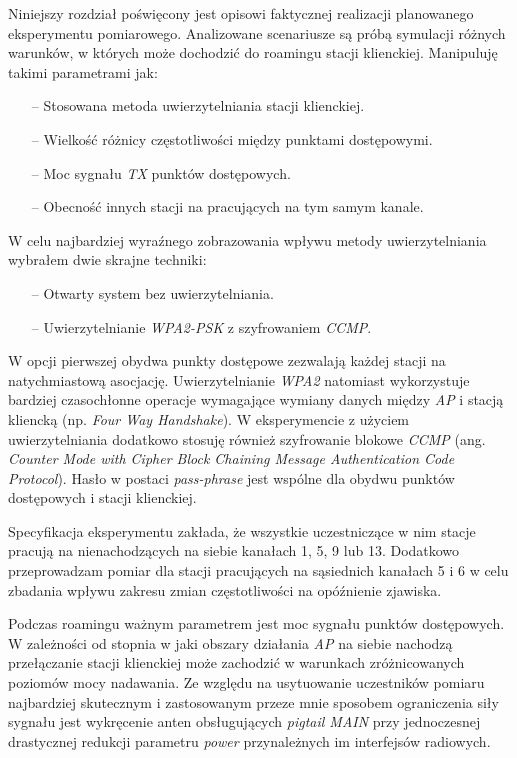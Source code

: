 %

Niniejszy rozdział poświęcony jest opisowi faktycznej realizacji planowanego eksperymentu pomiarowego. Analizowane scenariusze są próbą symulacji różnych warunków, w których może dochodzić do roamingu stacji klienckiej. Manipuluję takimi parametrami jak:
\begin{itemize}
\item[--] Stosowana metoda uwierzytelniania stacji klienckiej.
\item[--] Wielkość różnicy częstotliwości między punktami dostępowymi.
\item[--] Moc sygnału \emph{TX} punktów dostępowych. 
\item[--] Obecność innych stacji na pracujących na tym samym kanale.
\end{itemize}

W celu najbardziej wyraźnego zobrazowania wpływu metody uwierzytelniania wybrałem dwie skrajne techniki:
\begin{itemize}
\item[--] Otwarty system bez uwierzytelniania.
\item[--] Uwierzytelnianie \emph{WPA2-PSK} z szyfrowaniem \emph{CCMP}.
\end{itemize}

W opcji pierwszej obydwa punkty dostępowe zezwalają każdej stacji na natychmiastową asocjację. Uwierzytelnianie \emph{WPA2} natomiast wykorzystuje bardziej czasochłonne operacje wymagające wymiany danych między \emph{AP} i stacją kliencką (np. \emph{Four Way Handshake}). W eksperymencie z użyciem uwierzytelniania dodatkowo stosuję również szyfrowanie blokowe \emph{CCMP} (ang. \emph{Counter Mode with Cipher Block Chaining Message Authentication Code Protocol}). Hasło w postaci \emph{pass-phrase} jest wspólne dla obydwu punktów dostępowych i stacji klienckiej.

Specyfikacja eksperymentu zakłada, że wszystkie uczestniczące w nim stacje pracują na nienachodzących na siebie kanałach 1, 5, 9 lub 13. Dodatkowo przeprowadzam pomiar dla stacji pracujących na sąsiednich kanałach 5 i 6 w celu zbadania wpływu zakresu zmian częstotliwości na opóźnienie zjawiska.

Podczas roamingu ważnym parametrem jest moc sygnału punktów dostępowych. W zależności od stopnia w jaki obszary działania \emph{AP} na siebie nachodzą przełączanie stacji klienckiej może zachodzić w warunkach zróżnicowanych poziomów mocy nadawania. Ze względu na usytuowanie uczestników pomiaru najbardziej skutecznym i zastosowanym przeze mnie sposobem ograniczenia siły sygnału jest wykręcenie anten obsługujących \emph{pigtail MAIN} przy jednoczesnej drastycznej redukcji parametru \emph{power} przynależnych im interfejsów radiowych.

